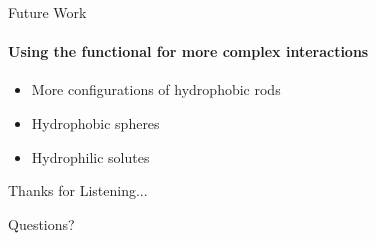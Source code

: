 \documentclass{beamer}
\begin{document}
\begin{frame}[fragile]{Future Work}
\framesubtitle{Using the functional for more complex interactions}
\begin{itemize}
 \item <1-> More configurations of hydrophobic rods
 \vspace{0.5cm}
 \item <2-> Hydrophobic spheres
 \vspace{0.5cm}
 \item <3-> Hydrophilic solutes
\end{itemize}
\end{frame}

\begin{frame}{Thanks for Listening...}
\begin{center} 
\huge{Questions?}
\end{center}
\end{frame}
\end{document}
